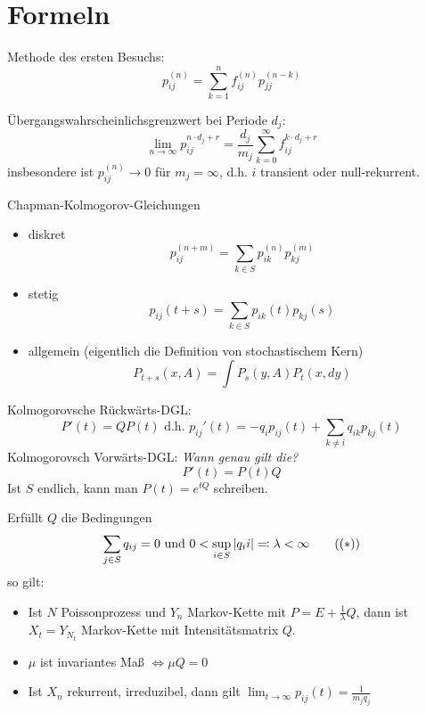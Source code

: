 \documentclass[a4paper,DIV15]{scrartcl}
\begin{document}
\section{Formeln}

Methode des ersten Besuchs:
\[
p_{ij}^{(n)} = \sum_{k=1}^n f_{ij}^{(n)} p_{jj}^{(n-k)}
\]

Übergangswahrscheinlichsgrenzwert bei Periode $d_j$:
\[
\lim_{n\to\infty} p_{ij}^{n\cdot d_j + r} = \frac{d_j}{m_j} \sum_{k=0}^\infty f_{ij}^{k\cdot d_j + r}
\]
insbesondere ist $p_{ij}^{(n)}\to 0$ für $m_j=\infty$, d.h. $i$ transient oder null-rekurrent.

Chapman-Kolmogorov-Gleichungen
\begin{itemize}
\item diskret
\[
p_{ij}^{(n+m)} = \sum_{k\in S} p_{ik}^{(n)} p_{kj}^{(m)}
\]
\item stetig
\[
p_{ij}(t+s) = \sum_{k\in S} p_{ik}(t) p_{kj}(s)
\]
\item allgemein (eigentlich die Definition von stochastischem Kern)
\[
P_{t+s}(x,A) = \int P_s(y,A)P_t(x,dy)
\]
\end{itemize}

Kolmogorovsche Rückwärts-DGL:
\[
P'(t) = QP(t) \text{ d.h. } p_{ij}'(t) = -q_ip_{ij}(t) + \sum_{k\ne i}q_{ik}p_{kj}(t)
\]
Kolmogorovsch Vorwärts-DGL: \emph{Wann genau gilt die?}
\[
P'(t) = P(t)Q
\]
Ist $S$ endlich, kann man $P(t) = e^{tQ}$ schreiben.

Erfüllt $Q$ die Bedingungen
\begin{align*}
\sum_{j\in S} q_{ij} = 0\text{ und } 0<\sup_{i\in S} |q_ii| \ad \lambda <\infty \tag{($*$)}
\end{align*}
so gilt:
\begin{itemize}
\item Ist $N$ Poissonprozess und $Y_n$ Markov-Kette mit $P=E+\frac 1 \lambda Q$, dann ist $X_t=Y_{N_t}$ Markov-Kette mit Intensitätsmatrix $Q$.
\item $\mu$ ist invariantes Maß $\iff \mu Q = 0$
\item Ist $X_n$ rekurrent, irreduzibel, dann gilt $\lim_{t\to\infty} p_{ij}(t) = \frac1{m_jq_j}$
\end{itemize}
\end{document}
